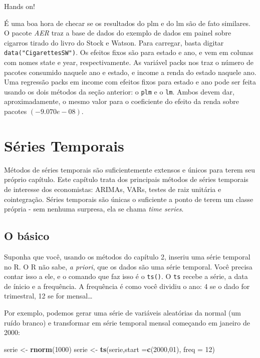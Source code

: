 \documentclass[
]{book}
\newenvironment{Shaded}{\begin{snugshade}}{\end{snugshade}}
\newcommand{\DataTypeTok}[1]{\textcolor[rgb]{0.13,0.29,0.53}{#1}}
\newcommand{\DecValTok}[1]{\textcolor[rgb]{0.00,0.00,0.81}{#1}}
\newcommand{\KeywordTok}[1]{\textcolor[rgb]{0.13,0.29,0.53}{\textbf{#1}}}
\newcommand{\NormalTok}[1]{#1}
\newcommand{\StringTok}[1]{\textcolor[rgb]{0.31,0.60,0.02}{#1}}
\begin{document}
Hands on!

É uma boa hora de checar se os resultados do plm e do lm são de fato similares. O pacote \emph{AER} traz a base de dados do exemplo de dados em painel sobre cigarros tirado do livro do Stock e Watson. Para carregar, basta digitar \texttt{data("CigarettesSW")}. Os efeitos fixos são para estado e ano, e vem em colunas com nomes state e year, respectivamente. As variável packs nos traz o número de pacotes consumido naquele ano e estado, e income a renda do estado naquele ano. Uma regressão packs em income com efeitos fixos para estado e ano pode ser feita usando os dois métodos da seção anterior: o \texttt{plm} e o \texttt{lm}. Ambos devem dar, aproximadamente, o mesmo valor para o coeficiente do efeito da renda sobre pacotes \((-9.070e-08)\).

\hypertarget{suxe9ries-temporais}{%
\chapter{Séries Temporais}\label{suxe9ries-temporais}}

Métodos de séries temporais são suficientemente extensos e únicos para terem seu próprio capítulo. Este capítulo trata dos principais métodos de séries temporais de interesse dos economistas: ARIMAs, VARs, testes de raiz unitária e cointegração. Séries temporais são únicas o suficiente a ponto de terem um classe própria - sem nenhuma surpresa, ela se chama \emph{time series}.

\hypertarget{o-buxe1sico}{%
\section{O básico}\label{o-buxe1sico}}

Suponha que você, usando os métodos do capítulo 2, inseriu uma série temporal no R. O R não sabe, \emph{a priori}, que os dados são uma série temporal. Você precisa contar isso a ele, e o comando que faz isso é o \texttt{ts()}. O \texttt{ts} recebe a série, a data de ínicio e a frequência. A frequência é como você dividiu o ano: 4 se o dado for trimestral, 12 se for mensal\ldots{}

Por exemplo, podemos gerar uma série de variáveis aleatórias da normal (um ruído branco) e transformar em série temporal mensal começando em janeiro de 2000:

\begin{Shaded}
\begin{Highlighting}[]
\NormalTok{serie \textless{}{-}}\StringTok{ }\KeywordTok{rnorm}\NormalTok{(}\DecValTok{1000}\NormalTok{)}
\NormalTok{serie \textless{}{-}}\StringTok{ }\KeywordTok{ts}\NormalTok{(serie,}\DataTypeTok{start =}\KeywordTok{c}\NormalTok{(}\DecValTok{2000}\NormalTok{,}\DecValTok{01}\NormalTok{), }\DataTypeTok{freq =} \DecValTok{12}\NormalTok{)}
\end{Highlighting}
\end{Shaded}
\end{document}
